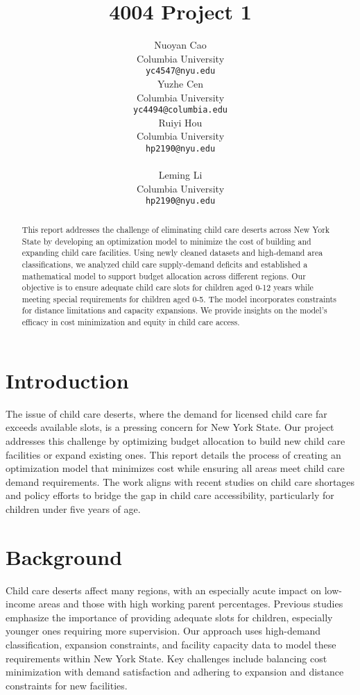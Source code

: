 \documentclass[11pt]{article}
\title{4004 Project 1}
\author{Nuoyan Cao \\
 Columbia University \\
  \texttt{yc4547@nyu.edu} \\\And
  Yuzhe Cen \\
  Columbia University \\
  \texttt{yc4494@columbia.edu} \\\And
  Ruiyi Hou \\
   Columbia University \\
  \texttt{hp2190@nyu.edu} \\ \\\And
  Leming Li \\
   Columbia University \\
  \texttt{hp2190@nyu.edu} \\}
\begin{document}
\maketitle

\begin{abstract}
This report addresses the challenge of eliminating child care deserts across New York State by developing an optimization model to minimize the cost of building and expanding child care facilities. Using newly cleaned datasets and high-demand area classifications, we analyzed child care supply-demand deficits and established a mathematical model to support budget allocation across different regions. Our objective is to ensure adequate child care slots for children aged 0-12 years while meeting special requirements for children aged 0-5. The model incorporates constraints for distance limitations and capacity expansions. We provide insights on the model’s efficacy in cost minimization and equity in child care access.
\end{abstract}
\section{Introduction}

The issue of child care deserts, where the demand for licensed child care far exceeds available slots, is a pressing concern for New York State. Our project addresses this challenge by optimizing budget allocation to build new child care facilities or expand existing ones. This report details the process of creating an optimization model that minimizes cost while ensuring all areas meet child care demand requirements. The work aligns with recent studies on child care shortages and policy efforts to bridge the gap in child care accessibility, particularly for children under five years of age.

\section{Background}
Child care deserts affect many regions, with an especially acute impact on low-income areas and those with high working parent percentages. Previous studies emphasize the importance of providing adequate slots for children, especially younger ones requiring more supervision. Our approach uses high-demand classification, expansion constraints, and facility capacity data to model these requirements within New York State. Key challenges include balancing cost minimization with demand satisfaction and adhering to expansion and distance constraints for new facilities.
\end{document}
